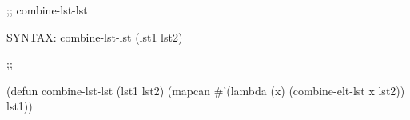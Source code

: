 \begin{aibox}{\function}
;; combine-lst-lst

SYNTAX: combine-lst-lst (lst1 lst2)
\end{aibox}

\begin{aibox}{\examples}

\end{aibox}

\begin{aibox}{\comments}

\end{aibox}
\begin{aibox}{\answers}

\end{aibox}
\begin{aibox}{\othercomments}

\end{aibox}
\begin{aibox}{\pseudocode}

\end{aibox}
\begin{aibox}{\code}

;;%

(defun combine-lst-lst (lst1 lst2)
			(mapcan \#'(lambda (x) (combine-elt-lst x lst2)) lst1))

\end{aibox}
